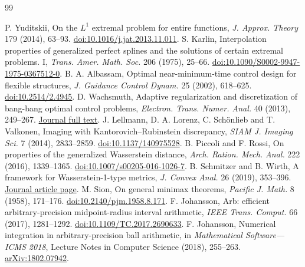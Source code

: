 \documentclass[11pt,a4paper]{article}
\numberwithin{equation}{section}
\theoremstyle{remark}\newtheorem{remark}[theorem]{Remark}
\begin{document}
\begin{thebibliography}{99}\small\raggedright
{} P. Yuditskii, On the $L^1$ extremal problem for entire
functions, \emph{J. Approx. Theory} 179 (2014), 63--93.
\href{https://doi.org/10.1016/j.jat.2013.11.011}{doi:10.1016/j.jat.2013.11.011}.
 S. Karlin, Interpolation properties of generalized perfect
splines and the solutions of certain extremal problems. I,
\emph{Trans. Amer. Math. Soc.} 206 (1975), 25--66.
\href{https://doi.org/10.1090/S0002-9947-1975-0367512-0}{doi:10.1090/S0002-9947-1975-0367512-0}.
 B. A. Albassam, Optimal near-minimum-time control design
for flexible structures, \emph{J. Guidance Control Dynam.} 25 (2002), 618--625.
\href{https://doi.org/10.2514/2.4945}{doi:10.2514/2.4945}.
 D. Wachsmuth, Adaptive regularization and discretization
of bang-bang optimal control problems, \emph{Electron. Trans. Numer. Anal.}
40 (2013), 249--267.
\href{https://etna.ricam.oeaw.ac.at/vol.40.2013/pp249-267.dir/pp249-267.pdf}{Journal full text}.
 J. Lellmann, D. A. Lorenz, C. Sch\"onlieb and T. Valkonen,
Imaging with Kantorovich--Rubinstein discrepancy,
\emph{SIAM J. Imaging Sci.} 7 (2014), 2833--2859.
\href{https://doi.org/10.1137/140975528}{doi:10.1137/140975528}.
 B. Piccoli and F. Rossi, On properties of the generalized
Wasserstein distance, \emph{Arch. Ration. Mech. Anal.} 222 (2016), 1339--1365.
\href{https://doi.org/10.1007/s00205-016-1026-7}{doi:10.1007/s00205-016-1026-7}.
 B. Schmitzer and B. Wirth, A framework for Wasserstein-1-type
metrics, \emph{J. Convex Anal.} 26 (2019), 353--396.
\href{https://journalofconvexanalysis.com/articles/jca26020/}{Journal article page}.
 M. Sion, On general minimax theorems,
\emph{Pacific J. Math.} 8 (1958), 171--176.
\href{https://doi.org/10.2140/pjm.1958.8.171}{doi:10.2140/pjm.1958.8.171}.
 F. Johansson, Arb: efficient arbitrary-precision
midpoint-radius interval arithmetic, \emph{IEEE Trans. Comput.}
66 (2017), 1281--1292.
\href{https://doi.org/10.1109/TC.2017.2690633}{doi:10.1109/TC.2017.2690633}.
 F. Johansson, Numerical integration in
arbitrary-precision ball arithmetic, in \emph{Mathematical Software---ICMS
2018}, Lecture Notes in Computer Science (2018), 255--263.
\href{https://arxiv.org/abs/1802.07942}{arXiv:1802.07942}.
\end{thebibliography}
\end{document}
